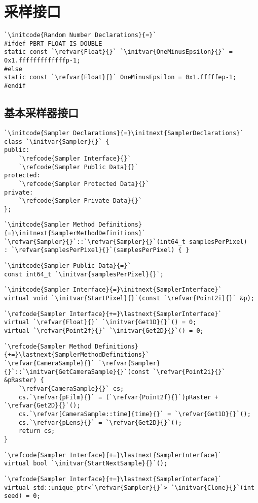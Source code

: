 \section{采样接口}\label{sec:采样接口}

\begin{lstlisting}
`\initcode{Random Number Declarations}{=}`
#ifdef PBRT_FLOAT_IS_DOUBLE
static const `\refvar{Float}{}` `\initvar{OneMinusEpsilon}{}` = 0x1.fffffffffffffp-1;
#else
static const `\refvar{Float}{}` OneMinusEpsilon = 0x1.fffffep-1;
#endif
\end{lstlisting}

\subsection{基本采样器接口}\label{sub:基本采样器接口}

\begin{lstlisting}
`\initcode{Sampler Declarations}{=}\initnext{SamplerDeclarations}`
class `\initvar{Sampler}{}` {
public:
    `\refcode{Sampler Interface}{}`
    `\refcode{Sampler Public Data}{}`
protected:
    `\refcode{Sampler Protected Data}{}`
private:
    `\refcode{Sampler Private Data}{}`
};
\end{lstlisting}
\begin{lstlisting}
`\initcode{Sampler Method Definitions}{=}\initnext{SamplerMethodDefinitions}`
`\refvar{Sampler}{}`::`\refvar{Sampler}{}`(int64_t samplesPerPixel)
: `\refvar{samplesPerPixel}{}`(samplesPerPixel) { }
\end{lstlisting}
\begin{lstlisting}
`\initcode{Sampler Public Data}{=}`
const int64_t `\initvar{samplesPerPixel}{}`;
\end{lstlisting}
\begin{lstlisting}
`\initcode{Sampler Interface}{=}\initnext{SamplerInterface}`
virtual void `\initvar{StartPixel}{}`(const `\refvar{Point2i}{}` &p);
\end{lstlisting}
\begin{lstlisting}
`\refcode{Sampler Interface}{+=}\lastnext{SamplerInterface}`
virtual `\refvar{Float}{}` `\initvar{Get1D}{}`() = 0;
virtual `\refvar{Point2f}{}` `\initvar{Get2D}{}`() = 0;
\end{lstlisting}
\begin{lstlisting}
`\refcode{Sampler Method Definitions}{+=}\lastnext{SamplerMethodDefinitions}`
`\refvar{CameraSample}{}` `\refvar{Sampler}{}`::`\initvar{GetCameraSample}{}`(const `\refvar{Point2i}{}` &pRaster) {
    `\refvar{CameraSample}{}` cs;
    cs.`\refvar{pFilm}{}` = (`\refvar{Point2f}{}`)pRaster + `\refvar{Get2D}{}`();
    cs.`\refvar[CameraSample::time]{time}{}` = `\refvar{Get1D}{}`();
    cs.`\refvar{pLens}{}` = `\refvar{Get2D}{}`();
    return cs;
}
\end{lstlisting}
\begin{lstlisting}
`\refcode{Sampler Interface}{+=}\lastnext{SamplerInterface}`
virtual bool `\initvar{StartNextSample}{}`();
\end{lstlisting}
\begin{lstlisting}
`\refcode{Sampler Interface}{+=}\lastnext{SamplerInterface}`
virtual std::unique_ptr<`\refvar{Sampler}{}`> `\initvar{Clone}{}`(int seed) = 0;
\end{lstlisting}